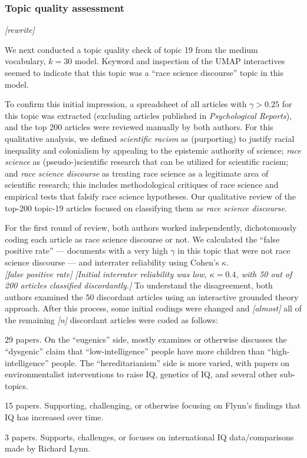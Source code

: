 \documentclass[12pt]{article}
\providecommand{\tightlist}{%
  \setlength{\itemsep}{0pt}\setlength{\parskip}{0pt}}
\begin{document}
\hypertarget{topic-quality-assessment}{%
\subsubsection*{Topic quality assessment}\label{topic-quality-assessment}}

\emph{{[}rewrite{]}}

We next conducted a topic quality check of topic 19 from the medium vocabulary, \(k=30\) model. Keyword and inspection of the UMAP interactives seemed to indicate that this topic was a ``race science discourse'' topic in this model.

To confirm this initial impression, a spreadsheet of all articles with \(\gamma > 0.25\) for this topic was extracted (excluding articles published in \emph{Psychological Reports}), and the top 200 articles were reviewed manually by both authors. For this qualitative analysis, we defined \emph{scientific racism} as (purporting) to justify racial inequality and colonialism by appealing to the epistemic authority of science; \emph{race science} as (pseudo-)scientific research that can be utilized for scientific racism; and \emph{race science discourse} as treating race science as a legitimate area of scientific research; this includes methodological critiques of race science and empirical tests that falsify race science hypotheses. Our qualitative review of the top-200 topic-19 articles focused on classifying them as \emph{race science discourse}.

For the first round of review, both authors worked independently, dichotomously coding each article as race science discourse or not. We calculated the ``false positive rate'' --- documents with a very high \(\gamma\) in this topic that were not race science discourse --- and interrater reliability using Cohen's \(\kappa\).\\
\emph{{[}false positive rate{]}}
\emph{{[}Initial interrater reliability was low, \(\kappa = 0.4\), with 50 out of 200 articles classified discordantly.{]}} To understand the disagreement, both authors examined the 50 discordant articles using an interactive grounded theory approach. After this process, some initial codings were changed and \emph{{[}almost{]}} all of the remaining \emph{{[}n{]}} discordant articles were coded as follows:

\begin{description}
\tightlist
\item[hereditarianism and/or eugenics]
29 papers. On the ``eugenics'' side, mostly examines or otherwise discusses the ``dysgenic'' claim that ``low-intelligence'' people have more children than ``high-intelligence'' people. The ``hereditarianism'' side is more varied, with papers on environmentalist interventions to raise IQ, genetics of IQ, and several other sub-topics.
\item[Flynn effect]
15 papers. Supporting, challenging, or otherwise focusing on Flynn's findings that IQ has increased over time.
\item[Lynn/national IQ]
3 papers. Supports, challenges, or focuses on international IQ data/comparisons made by Richard Lynn.
\end{description}
\end{document}
